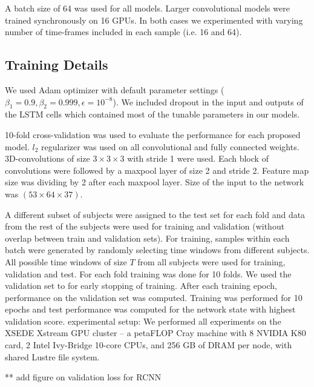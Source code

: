 \documentclass{article}
\begin{document}
A batch size of 64 was used for all models. Larger convolutional models were trained synchronously on 16 GPUs. In both cases we experimented with varying number of time-frames included in each sample (i.e. 16 and 64).

\subsection{Training Details}
\label{training_details}

We used Adam optimizer with default parameter settings ($\beta_1=0.9, \beta_2=0.999, \epsilon=10^{-8}$). We included dropout in the input and outputs of the LSTM cells \citep{Zaremba2014} which contained most of the tunable parameters in our models. 

10-fold cross-validation was used to evaluate the performance for each proposed model. $l_2$ regularizer was used on all convolutional and fully connected weights. 
3D-convolutions of size $3\times3\times3$ with stride 1 were used. Each block of convolutions were followed by a maxpool layer of size 2 and stride 2. Feature map size was dividing by 2 after each maxpool layer. Size of the input to the network was $(53\times64\times37)$.

A different subset of subjects were assigned to the test set for each fold and data from the rest of the subjects were used for training and validation (without overlap between train and validation sets). For training, samples within each batch were generated by randomly selecting time windows from different subjects. All possible time windows of size $T$ from all subjects were used for training, validation and test. For each fold training was done for 10 folds. We used the validation set to for early stopping of training. After each training epoch, performance on the validation set was computed. Training was performed for 10 epochs and test performance was computed for the network state with highest validation score. 
experimental setup: We performed all experiments on the XSEDE Xstream GPU cluster \citep{Towns2014} -- a petaFLOP Cray machine with 8 NVIDIA K80 card, 2 Intel Ivy-Bridge 10-core CPUs, and 256 GB of DRAM per node, with shared Lustre file system.


** add figure on validation loss for RCNN
\end{document}
